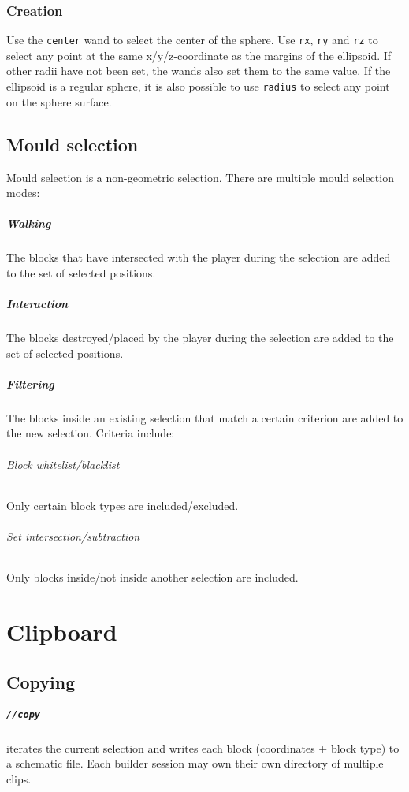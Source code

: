 \documentclass{report}
\begin{document}
				\subsection{Creation} Use the \texttt{center} wand to select the center of the sphere. Use
				\texttt{rx}, \texttt{ry} and \texttt{rz} to select any point at the same x/y/z-coordinate as the margins
				of the ellipsoid. If other radii have not been set, the wands also set them to the same value. If the
				ellipsoid is a regular sphere, it is also possible to use \texttt{radius} to select any point on the
				sphere surface.

			\section{Mould selection}
				Mould selection is a non-geometric selection. There are multiple mould selection modes:
				\paragraph{Walking} The blocks that have intersected with the player during the selection are added
				to the set of selected positions.
				\paragraph{Interaction} The blocks destroyed/placed by the player during the selection are added to the
				set of selected positions.
				\paragraph{Filtering} The blocks inside an existing selection that match a certain criterion are added
				to the new selection. Criteria include:
					\subparagraph{Block whitelist/blacklist} Only certain block types are included/excluded.
					\subparagraph{Set intersection/subtraction} Only blocks inside/not inside another selection are
					included.

		\chapter{Clipboard}
			\label{sec:clipboard}
			\section{Copying}
				\paragraph{\texttt{//copy}} iterates the current selection and writes each block (coordinates + block
				type) to a schematic file. Each builder session may own their own directory of multiple clips.
\end{document}
